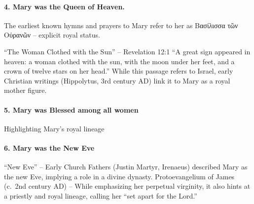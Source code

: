 \paragraph{4.
Mary was the Queen of Heaven.}\label{par:mary-was-the-queen-of-heaven.}

The earliest known hymns and prayers to Mary refer to her as Βασίλισσα τῶν Οὐρανῶν -- explicit royal status.

``The Woman Clothed with the Sun'' -- Revelation 12:1 ``A great sign appeared in heaven: a woman clothed with the sun, with the moon under her feet, and a crown of twelve stars on her head.'' While this passage refers to Israel, early Christian writings (Hippolytus, 3rd century AD) link it to Mary as a royal mother figure.

\paragraph{5.
Mary was Blessed among all women}\label{par:mary-was-blessed-among-all-women}

Highlighting Mary's royal lineage

\paragraph{6.
Mary was the New Eve}\label{par:mary-was-the-new-eve}

``New Eve'' -- Early Church Fathers (Justin Martyr, Irenaeus) described Mary as the new Eve, implying a role in a divine dynasty.
Protoevangelium of James (c.~2nd century AD) -- While emphasizing her perpetual virginity, it also hints at a priestly and royal lineage, calling her ``set apart for the Lord.''
